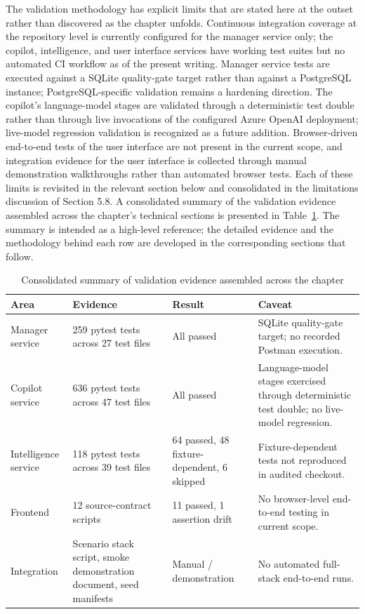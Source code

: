The validation methodology has explicit limits that are stated here at the outset rather than discovered as the chapter unfolds. Continuous integration coverage at the repository level is currently configured for the manager service only; the copilot, intelligence, and user interface services have working test suites but no automated CI workflow as of the present writing. Manager service tests are executed against a SQLite quality-gate target rather than against a PostgreSQL instance; PostgreSQL-specific validation remains a hardening direction. The copilot's language-model stages are validated through a deterministic test double rather than through live invocations of the configured Azure OpenAI deployment; live-model regression validation is recognized as a future addition. Browser-driven end-to-end tests of the user interface are not present in the current scope, and integration evidence for the user interface is collected through manual demonstration walkthroughs rather than automated browser tests. Each of these limits is revisited in the relevant section below and consolidated in the limitations discussion of Section 5.8.
A consolidated summary of the validation evidence assembled across the chapter's technical sections is presented in Table~\ref{tab:validation_summary}. The summary is intended as a high-level reference; the detailed evidence and the methodology behind each row are developed in the corresponding sections that follow.

\begin{table}[H]
\centering
\renewcommand{\arraystretch}{1.4}
\begin{tabular}{|p{2.4cm}|p{4cm}|p{3cm}|p{4cm}|}
\hline
\rowcolor{lightgray}
\textbf{Area} & \textbf{Evidence} & \textbf{Result} & \textbf{Caveat} \\ \hline
Manager service & 259 pytest tests across 27 test files & All passed & SQLite quality-gate target; no recorded Postman execution. \\ \hline
Copilot service & 636 pytest tests across 47 test files & All passed & Language-model stages exercised through deterministic test double; no live-model regression. \\ \hline
Intelligence service & 118 pytest tests across 39 test files & 64 passed, 48 fixture-dependent, 6 skipped & Fixture-dependent tests not reproduced in audited checkout. \\ \hline
Frontend & 12 source-contract scripts & 11 passed, 1 assertion drift & No browser-level end-to-end testing in current scope. \\ \hline
Integration & Scenario stack script, smoke demonstration document, seed manifests & Manual / demonstration & No automated full-stack end-to-end runs. \\ \hline
\end{tabular}
\caption{Consolidated summary of validation evidence assembled across the chapter}
\label{tab:validation_summary}
\end{table}

